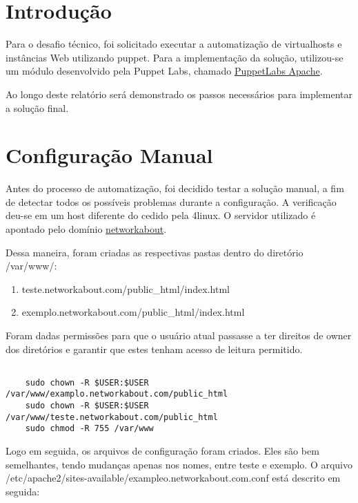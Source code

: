 \documentclass[12pt]{article}
\begin{document}
\section{Introdução}
Para o desafio técnico, foi solicitado executar a automatização de virtualhosts e instâncias Web utilizando puppet. Para a implementação da solução,
utilizou-se um módulo desenvolvido pela Puppet Labs, chamado
\href{https://github.com/puppetlabs/puppetlabs-apache}{PuppetLabs Apache}. 

Ao longo deste relatório será demonstrado os passos necessários para implementar a solução final.

\section{Configuração Manual}
\label{sec:configura_o_manual}
Antes do processo de automatização, foi decidido testar a solução manual, a fim de detectar todos os possíveis problemas durante a configuração.
A verificação deu-se em um host diferente do cedido pela 4linux. O servidor utilizado é apontado pelo domínio \href{networkabout.com}{networkabout}.

Dessa maneira, foram criadas as respectivas pastas dentro do diretório /var/www/:

\begin{enumerate}
    \item teste.networkabout.com/public\_html/index.html 
    \item exemplo.networkabout.com/public\_html/index.html 
\end{enumerate}

Foram dadas permissões para que o usuário atual passasse a ter direitos de owner dos diretórios e garantir que estes tenham acesso de leitura
permitido.

\begin{verbatim}

    sudo chown -R $USER:$USER /var/www/examplo.networkabout.com/public_html
    sudo chown -R $USER:$USER /var/www/teste.networkabout.com/public_html
    sudo chmod -R 755 /var/www

\end{verbatim}

Logo em seguida, os arquivos de configuração foram criados. Eles são bem semelhantes, tendo mudanças apenas nos nomes, entre teste e exemplo.
O arquivo /etc/apache2/sites-available/exampleo.networkabout.com.conf está descrito em seguida:
\end{document}
